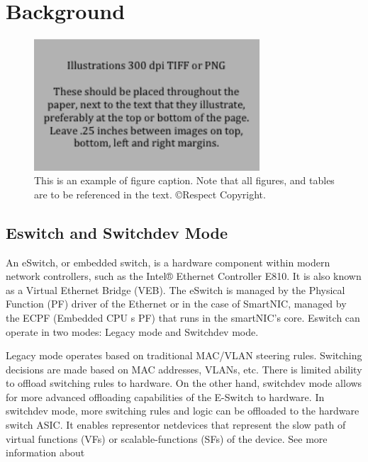 \documentclass[letterpaper]{article}
\begin{document}
\section{Background}
\begin{figure}[h]
\includegraphics[width=3.31in]{figure.png}
\caption{This is an example of figure caption. Note that all figures, and tables are to be referenced in the text. \copyright Respect Copyright.}
\end{figure}

\subsection{Eswitch and Switchdev Mode}
An eSwitch, or embedded switch, is a hardware component within modern network
controllers, such as the Intel® Ethernet Controller E810. It is also known as
a Virtual Ethernet Bridge (VEB). The eSwitch is managed by the Physical Function (PF)
driver of the Ethernet or in the case of SmartNIC, managed by the ECPF (Embedded CPU
s PF) that runs in the smartNIC's core. Eswitch can operate in two modes:
Legacy mode and Switchdev mode. 

Legacy mode operates based on traditional MAC/VLAN steering rules. Switching
decisions are made based on MAC addresses, VLANs, etc. There is limited ability
to offload switching rules to hardware.
On the other hand, switchdev mode allows for more advanced offloading
capabilities of the E-Switch to hardware. In switchdev mode, more switching
rules and logic can be offloaded to the hardware switch ASIC. It enables
representor netdevices that represent the slow path of virtual functions (VFs)
or scalable-functions (SFs) of the device. See more information about
\end{document}
